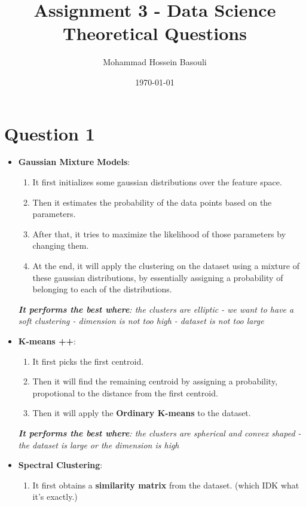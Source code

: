 \documentclass[a4paper,12pt]{article}
\begin{document}
\title{Assignment 3 - Data Science \\
Theoretical Questions}
\author{Mohammad Hossein Basouli}
\date{\today}
\maketitle

\section*{Question 1}
\begin{itemize}
    \item \textbf{Gaussian Mixture Models}: 
    \begin{enumerate}
        \item It first initializes some gaussian distributions over the feature space.
        \item Then it estimates the probability of the data points based on the parameters.
        \item After that, it tries to maximize the likelihood of those parameters by changing them.
        \item At the end, it will apply the clustering on the dataset using a mixture of these gaussian distributions, by essentially assigning a probability of belonging to each of the distributions.
    \end{enumerate}
    \textit{\textbf{It performs the best where}: the clusters are elliptic - we want to have a soft clustering - dimension is not too high - dataset is not too large}
    \item \textbf{K-means ++}: 
    \begin{enumerate}
        \item It first picks the first centroid.
        \item Then it will find the remaining centroid by assigning a probability, propotional to the distance from the first centroid. 
        \item Then it will apply the \textbf{Ordinary K-means} to the dataset. 
    \end{enumerate}
    \textit{\textbf{It performs the best where}: the clusters are spherical and convex shaped - the dataset is large or the dimension is high}
    \item \textbf{Spectral Clustering}: 
    \begin{enumerate}
        \item It first obtains a \textbf{similarity matrix} from the dataset. (which IDK what it's exactly.)

\end{enumerate}
\end{itemize}
\end{document}
